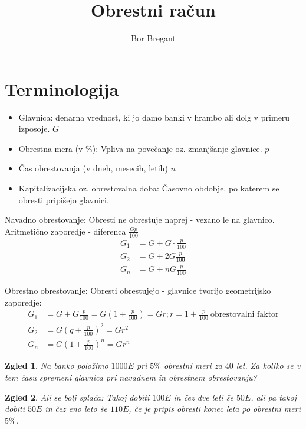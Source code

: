 \documentclass{article}
\title{Obrestni račun}
\author{Bor Bregant}
\date{\vspace{-5ex}}
\newtheorem*{zgled}{Zgled}
\begin{document}
\maketitle

\section{Terminologija}

\begin{itemize}
    \item Glavnica: denarna vrednost, ki jo damo banki v hrambo ali dolg v primeru izposoje. $G$
    \item Obrestna mera (v \%): Vpliva na povečanje oz. zmanjšanje glavnice. $p$
    \item Čas obrestovanja (v dneh, mesecih, letih) $n$
    \item Kapitalizacijska oz. obrestovalna doba: Časovno obdobje, po katerem se obresti pripišejo glavnici.
\end{itemize}

Navadno obrestovanje: Obresti ne obrestuje naprej - vezano le na glavnico.\\
Aritmetično zaporedje - diferenca $\frac{Gp}{100}$
\begin{align*} 
G_1 &= G+G\cdot\frac{p}{100}\\
G_2 &= G+2G\frac{p}{100}\\
G_n &=G+nG\frac{p}{100}
\end{align*} 

Obrestno obrestovanje: Obresti obrestujejo - glavnice tvorijo geometrijsko zaporedje:
\begin{align*} 
G_1&=G+G\frac{p}{100}=G(1+\frac{p}{100})=Gr; r=1+\frac{p}{100}\ \text{obrestovalni faktor}\\
G_2&=G(q+\frac{p}{100})^2=Gr^2\\
G_n&=G(1+\frac{p}{100})^n=Gr^n
\end{align*} 

\begin{zgled}
    Na banko položimo $1000E$ pri $5\%$ obrestni meri za $40$ let. Za koliko se v tem času spremeni glavnica pri navadnem in obrestnem obrestovanju?
\end{zgled}
\begin{zgled}
    Ali se bolj splača: Takoj dobiti $100E$ in čez dve leti še $50E$, ali pa takoj dobiti $50E$ in čez eno leto še $110E$, če je pripis obresti konec leta po obrestni meri $5\%$.
\end{zgled}
\end{document}
